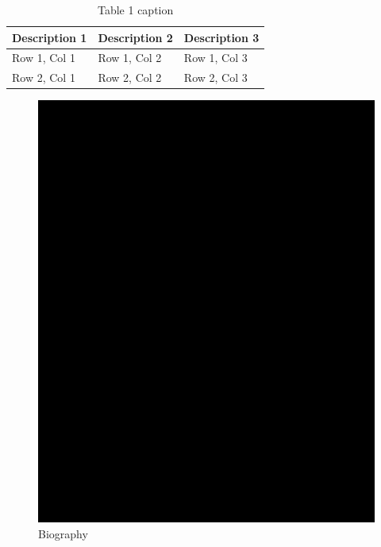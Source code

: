 \documentclass{WileyMSP-template}
\begin{document}
\begin{table}
 \caption{Table 1 caption}
  \begin{tabular}[htbp]{@{}lll@{}}
    \hline
    Description 1 & Description 2 & Description 3 \\
    \hline
    Row 1, Col 1  & Row 1, Col 2  & Row 1, Col 3  \\
    Row 2, Col 1  & Row 2, Col 2  & Row 2, Col 3  \\
    \hline
  \end{tabular}
\end{table}



\begin{figure}
  \includegraphics{bio-placeholder.jpg}
  \caption*{Biography}
\end{figure}
\end{document}
